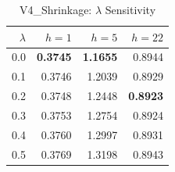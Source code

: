 \begin{table}[htbp]
\centering
\caption{V4\_Shrinkage: $\lambda$ Sensitivity}
\label{tab:shrinkage_sensitivity}
\begin{tabular}{rrrr}
\toprule
$\lambda$ & $h=1$ & $h=5$ & $h=22$ \\
\midrule
0.0 & \textbf{0.3745} & \textbf{1.1655} & 0.8944 \\
0.1 & 0.3746 & 1.2039 & 0.8929 \\
0.2 & 0.3748 & 1.2448 & \textbf{0.8923} \\
0.3 & 0.3753 & 1.2754 & 0.8924 \\
0.4 & 0.3760 & 1.2997 & 0.8931 \\
0.5 & 0.3769 & 1.3198 & 0.8943 \\
\bottomrule
\end{tabular}
\end{table}